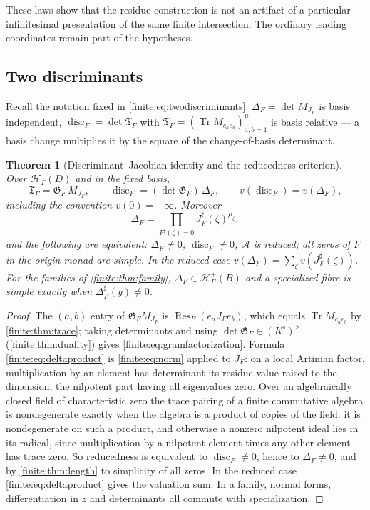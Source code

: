 \documentclass[11pt,letterpaper]{article}
\newtheorem{theorem}{Theorem}[section]
\theoremstyle{definition}
\theoremstyle{remark}
\newcommand{\HH}{\mathscr H}
\newcommand{\Hp}{\mathscr H^{+}}
\newcommand{\Alg}{\mathcal A}
\newcommand{\Kc}{K^{\circ}}
\newcommand{\sh}{^{\sharp}}
\newcommand{\Gram}{\mathfrak G}
\newcommand{\TGram}{\mathfrak T}
\DeclareMathOperator{\Res}{Res}
\DeclareMathOperator{\Tr}{Tr}
\DeclareMathOperator{\disc}{disc}
\numberwithin{equation}{section}
\begin{document}
These laws show that the residue construction is not an artifact of a particular infinitesimal presentation of the same finite intersection. The ordinary leading coordinates remain part of the hypotheses.

\subsection{Two discriminants}
\label{finite:sec:discriminant}

Recall the notation fixed in \eqref{finite:eq:twodiscriminants}: $\Delta_F=\det M_{J_F}$ is basis independent, $\disc_F=\det\TGram_F$ with $\TGram_F=(\Tr M_{e_ae_b})_{a,b=1}^\mu$ is basis relative --- a basis change multiplies it by the square of the change-of-basis determinant.

\begin{theorem}[Discriminant--Jacobian identity and the reducedness criterion]
\label{finite:thm:discriminant}
Over $\HH_\Gamma(D)$ and in the fixed basis,
\begin{equation}\label{finite:eq:gramfactorization}
 \TGram_F=\Gram_F\,M_{J_F},
 \qquad
 \disc_F=(\det\Gram_F)\,\Delta_F,
 \qquad
 v(\disc_F)=v(\Delta_F),
\end{equation}
including the convention $v(0)=+\infty$. Moreover
\begin{equation}\label{finite:eq:deltaproduct}
 \Delta_F=\prod_{F\sh(\zeta)=0}J_F\sh(\zeta)^{\mu_\zeta},
\end{equation}
and the following are equivalent: $\Delta_F\neq0$; $\disc_F\neq0$; $\Alg$ is reduced; all zeros of $F$ in the origin monad are simple. In the reduced case $v(\Delta_F)=\sum_\zeta v(J_F\sh(\zeta))$. For the families of \cref{finite:thm:family}, $\Delta_F\in\Hp_\Gamma(B)$ and a specialized fibre is simple exactly when $\Delta_F\sh(y)\neq0$.
\end{theorem}

\begin{proof}
The $(a,b)$ entry of $\Gram_FM_{J_F}$ is $\Res_F(e_aJ_Fe_b)$, which equals $\Tr M_{e_ae_b}$ by \cref{finite:thm:trace}; taking determinants and using $\det\Gram_F\in(\Kc)^\times$ (\cref{finite:thm:duality}) gives \eqref{finite:eq:gramfactorization}. Formula \eqref{finite:eq:deltaproduct} is \eqref{finite:eq:norm} applied to $J_F$: on a local Artinian factor, multiplication by an element has determinant its residue value raised to the dimension, the nilpotent part having all eigenvalues zero. Over an algebraically closed field of characteristic zero the trace pairing of a finite commutative algebra is nondegenerate exactly when the algebra is a product of copies of the field: it is nondegenerate on such a product, and otherwise a nonzero nilpotent ideal lies in its radical, since multiplication by a nilpotent element times any other element has trace zero. So reducedness is equivalent to $\disc_F\neq0$, hence to $\Delta_F\neq0$, and by \cref{finite:thm:length} to simplicity of all zeros. In the reduced case \eqref{finite:eq:deltaproduct} gives the valuation sum. In a family, normal forms, differentiation in $z$ and determinants all commute with specialization.
\end{proof}
\end{document}
